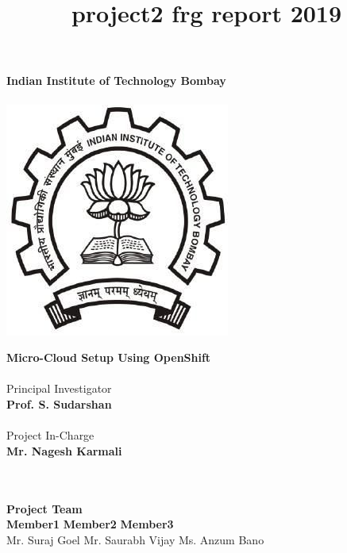 \documentclass[11pt]{report}
\title{project2 frg report 2019}
\begin{document}
	
	\begin{titlepage}
		\begin{center}
			\Huge
			
			\textbf{Indian Institute of Technology
				Bombay} \\
			\ \\
			
			
			\includegraphics[scale=1]{iitb}
			
			
			\textbf{Micro-Cloud Setup Using OpenShift}
			\ \\
			\ \\
			\Large
			Principal Investigator\\
			\textbf{Prof. S. Sudarshan }
			\ \\
			\ \\
			Project In-Charge\\
			\textbf{Mr. Nagesh Karmali}
			
			\ \\
			\ \\
			
			
			\Large
			\textbf{Project Team}
			\\
			\vspace{2cm}
			\textbf{Member1}
			\hspace{3cm}
			\textbf{Member2}
			\hspace{3cm}
			\textbf{Member3}
			\\
			Mr. Suraj Goel
			\hspace{1.2cm}
			Mr. Saurabh Vijay
			\hspace{1.cm}
			Ms. Anzum Bano\\
			\vfill
			
		\end{center}
	\end{titlepage}
	
\end{document}
